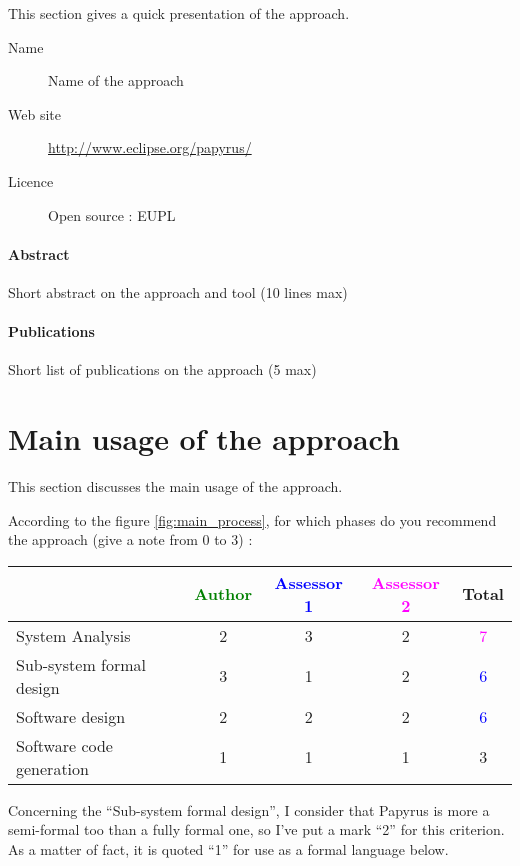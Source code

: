 This section gives a quick presentation of the approach.

\begin{description}
\item[Name] Name of the approach
\item[Web site] \url{http://www.eclipse.org/papyrus/}
\item[Licence] Open source : EUPL
\end{description}

\paragraph{Abstract} Short abstract on the approach and tool (10 lines max)

\paragraph{Publications} Short list of publications on the approach (5 max)


\section{Main usage of the approach}
\label{main_usage}
This section discusses the main usage of the approach.

According to the figure \ref{fig:main_process}, for which phases do you recommend the approach (give a note from 0 to 3) :

\begin{tabular}{|l | c | c | c | c|}
\hline
& \textcolor{green}{Author} & \textcolor{blue}{Assessor 1} & \textcolor{magenta}{Assessor 2} & Total \\
\hline
System Analysis & 2     & 3     & 2     & \textcolor{magenta}{7} \\
\hline
Sub-system formal design & 3     & 1     & 2     & \textcolor{blue}{6} \\
\hline
Software design & 2     & 2     & 2     & \textcolor{blue}{6} \\
\hline
Software code generation & 1     & 1     & 1     & 3     \\
\hline
\end{tabular}

\begin{assessor1}
Concerning the "`Sub-system formal design"', I consider that Papyrus is more a semi-formal too than a fully formal one, so I've put a mark "`2"' for this criterion. 
As a matter of fact, it is quoted "`1"' for use as a formal language below. 
\end{assessor1}

